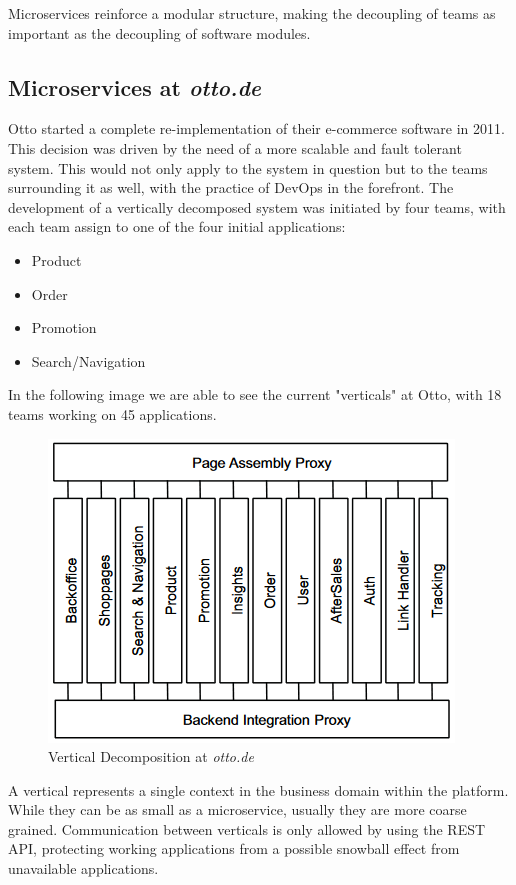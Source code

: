 \documentclass[14pt]{extarticle}
\begin{document}
Microservices reinforce a modular structure, making the decoupling of teams as important as the decoupling of software modules.

\subsection{Microservices at \textit{otto.de}}

Otto started a complete re-implementation of their e-commerce software in 2011. This decision was driven by the need of a more scalable and fault tolerant system. This would not only apply to the system in question but to the teams surrounding it as well, with the practice of DevOps in the forefront.
The development of a vertically decomposed system was initiated by four teams, with each team assign to one of the four initial applications:
\begin{itemize}
	\item Product
	\item Order
	\item Promotion
	\item Search/Navigation
\end{itemize}

In the following image we are able to see the current "verticals" at Otto, with 18 teams working on 45 applications.

\begin{figure}[H]
	\centering
	  \includegraphics[scale=0.5]{vertical_decomposition.png}
	\caption{Vertical Decomposition at \textit{otto.de}}
  \end{figure}

A vertical represents a single context in the business domain within the platform. While they can be as small as a microservice, usually they are more coarse grained. Communication between verticals is only allowed by using the REST API, protecting working applications from a possible snowball effect from unavailable applications.
\end{document}
